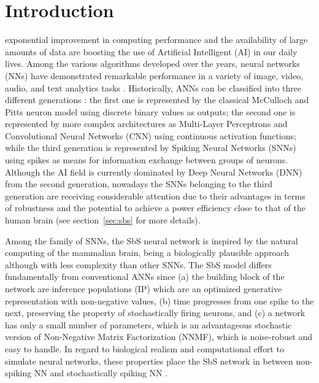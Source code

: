 
\section{Introduction}
\label{sec:introduction}
 exponential improvement in computing performance and the availability of large amounts of data are boosting the use of Artificial Intelligent (AI) in our daily lives. Among the various algorithms developed over the years, neural networks (NNs) have demonstrated remarkable performance in a variety of image, video, audio, and text analytics tasks \cite{schmidhuber2015deep,Taigman_2014_CVPR}. Historically, ANNs can be classified into three different generations \cite{Design_Exploration_SbS_Trans20}: the first one is represented by the classical McCulloch and Pitts neuron model using discrete binary values as outputs; the second one is represented by more complex architectures as Multi-Layer Perceptrons and Convolutional Neural Networks (CNN) using continuous activation functions; while the third generation is represented by Spiking Neural Networks (SNNs) using spikes as means for information exchange between groups of neurons. Although the AI field is currently dominated by Deep Neural Networks (DNN) from the second generation, nowadays the SNNs belonging to the third generation are receiving considerable attention \cite{Spinnaker_Trans13,ernst2007efficient,Design_Exploration_SbS_Trans20, SNN_Survey_Trans19} due to their advantages in terms of robustness and the
potential to achieve a power efficiency close to that of the human
brain (see section~\ref{sec:sbs} for more details).

Among the family of SNNs, the SbS neural network \cite{ernst2007efficient} is inspired by the natural computing of the mammalian brain, being a biologically plausible approach although with less complexity than other SNNs. The SbS model differs fundamentally from conventional ANNs since (a) the building block of the network are inference populations (IP) which are an optimized generative representation with non-negative values, (b) time progresses from one spike to the next, preserving the property of stochastically firing neurons, and (c) a network has only a small number of parameters, which is an advantageous stochastic version of Non-Negative Matrix Factorization (NNMF), which is noise-robust and easy to handle. In regard to biological realism and computational effort to simulate neural networks, these properties place the SbS network in between non-spiking NN and stochastically spiking NN \cite{rotermund2019Backpropagation}.

